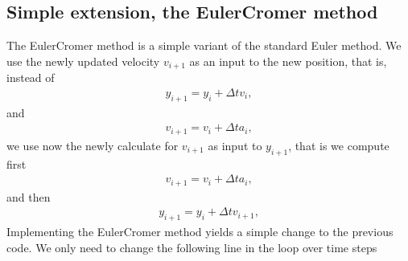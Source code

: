 \documentclass[letterpaper,10pt,english]{sphinxmanual}
\begin{document}
\subsection{Simple extension, the Euler\sphinxhyphen{}Cromer method}
\label{\detokenize{chapter2:simple-extension-the-euler-cromer-method}}
The Euler\sphinxhyphen{}Cromer method is a simple variant of the standard Euler
method. We use the newly updated velocity \(v_{i+1}\) as an input to the
new position, that is, instead of
\begin{equation*}
\begin{split}
y_{i+1} = y_i+\Delta t v_i,
\end{split}
\end{equation*}
and
\begin{equation*}
\begin{split}
v_{i+1} = v_i+\Delta t a_i,
\end{split}
\end{equation*}
we use now the newly calculate for \(v_{i+1}\) as input to \(y_{i+1}\), that is
we compute first
\begin{equation*}
\begin{split}
v_{i+1} = v_i+\Delta t a_i,
\end{split}
\end{equation*}
and then
\begin{equation*}
\begin{split}
y_{i+1} = y_i+\Delta t v_{i+1},
\end{split}
\end{equation*}
Implementing the Euler\sphinxhyphen{}Cromer method yields a simple change to the previous code. We only need to change the following line in the loop over time
steps

\begin{sphinxVerbatim}[commandchars=\\\{\}]
   
    \PYG{p}{[}\PYG{p}{]}  \PYG{p}{[}\PYG{p}{]}  \PYG{p}{[}\PYG{p}{]}
    \PYG{p}{[}\PYG{p}{]}  \PYG{p}{[}\PYG{p}{]}  \PYG{p}{[}\PYG{p}{]}
\end{sphinxVerbatim}
\end{document}
